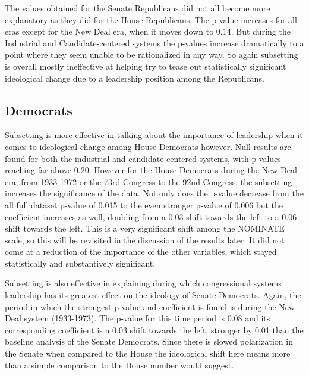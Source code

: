 \documentclass[12pt,twoside]{reedthesis}
\begin{document}
  The values obtained for the Senate Republicans did not all become more
  explanatory as they did for the House Republicans. The p-value increases
  for all eras except for the New Deal era, when it moves down to 0.14.
  But during the Industrial and Candidate-centered systems the p-values
  increase dramatically to a point where they seem unable to be
  rationalized in any way. So again subsetting is overall mostly
  ineffective at helping try to tease out statistically significant
  ideological change due to a leadership position among the Republicans.
  
  \subsection{Democrats}\label{democrats-1}
  
  Subsetting is more effective in talking about the importance of
  leadership when it comes to ideological change among House Democrats
  however. Null results are found for both the industrial and candidate
  centered systems, with p-values reaching far above 0.20. However for the
  House Democrats during the New Deal era, from 1933-1972 or the 73rd
  Congress to the 92nd Congress, the subsetting increases the significance
  of the data. Not only does the p-value decrease from the all full
  dataset p-value of 0.015 to the even stronger p-value of 0.006 but the
  coefficient increases as well, doubling from a 0.03 shift towards the
  left to a 0.06 shift towards the left. This is a very significant shift
  among the NOMINATE scale, so this will be revisited in the discussion of
  the results later. It did not come at a reduction of the importance of
  the other variables, which stayed statistically and substantively
  significant.
  
  Subsetting is also effective in explaining during which congressional
  systems leadership has its greatest effect on the ideology of Senate
  Democrats. Again, the period in which the strongest p-value and
  coefficient is found is during the New Deal system (1933-1973). The
  p-value for this time period is 0.08 and its corresponding coefficient
  is a 0.03 shift towards the left, stronger by 0.01 than the baseline
  analysis of the Senate Democrats. Since there is slowed polarization in
  the Senate when compared to the House the ideological shift here means
  more than a simple comparison to the House number would suggest.
  
\end{document}
